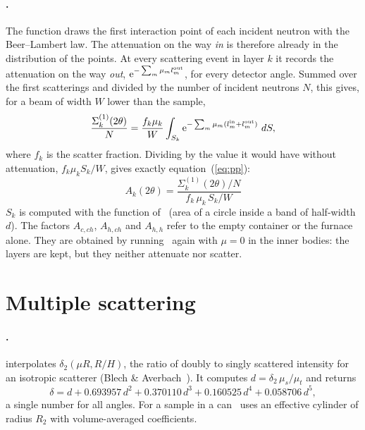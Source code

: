 \documentclass[11pt,a4paper]{report}
\begin{document}
\paragraph{\mcams.} The function  draws the first
interaction point of each incident neutron with the Beer--Lambert law. The
attenuation on the way \emph{in} is therefore already in the distribution of the
points. At every scattering event in layer $k$ it records the attenuation on the
way \emph{out}, $\operatorname{e}^{-\sum_m\mu_m l_m^{\text{out}}}$, for every detector angle.
Summed over the first scatterings and divided by the number of incident
neutrons $N$, this gives, for a beam of width $W$ lower than the sample,
\begin{equation}
  \frac{\Sigma_k^{(1)}(2\theta)}{N} = \frac{f_k\mu_k}{W}
  \int_{S_k}\operatorname{e}^{-\sum_m \mu_m(l^{\text{in}}_m+l^{\text{out}}_m)}\,dS ,
\end{equation}
where $f_k$ is the scatter fraction. Dividing by the value it would have without
attenuation, $f_k\mu_k S_k/W$, gives exactly equation~(\ref{eq:pp}):
\begin{equation}
  \boxed{A_k(2\theta) = \frac{\Sigma_k^{(1)}(2\theta)/N}{f_k\,\mu_k\,S_k/W}}
  \label{eq:mcA}
\end{equation}
$S_k$ is computed with the function  of \pyc\ (area of a circle
inside a band of half-width $d$). The factors $A_{c,ch}$, $A_{h,ch}$ and
$A_{h,h}$ refer to the empty container or the furnace alone. They are obtained
by running \mcams\ again with $\mu=0$ in the inner bodies: the layers are kept,
but they neither attenuate nor scatter.

\section{Multiple scattering}

\paragraph{\pyc.}  interpolates
$\delta_2(\mu R, R/H)$, the ratio of doubly to singly scattered intensity for an
isotropic scatterer (Blech \& Averbach~\cite{ba}). It computes
$d = \delta_2\,\mu_s/\mu_t$ and returns
\begin{equation}
  \delta = d + 0.693957\,d^2 + 0.370110\,d^3 + 0.160525\,d^4 + 0.058706\,d^5 ,
  \label{eq:series}
\end{equation}
a single number for all angles. For a sample in a can \cor\ uses an effective
cylinder of radius $R_2$ with volume-averaged coefficients.
\end{document}
